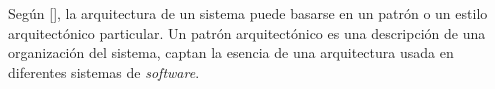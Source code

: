 Según [\cite{99}], la arquitectura de un sistema puede basarse en un patrón o un estilo arquitectónico particular. Un patrón arquitectónico es una descripción de una organización del sistema, captan la esencia de una arquitectura usada en diferentes sistemas de \textit{software}.


%
%
%
%
%

